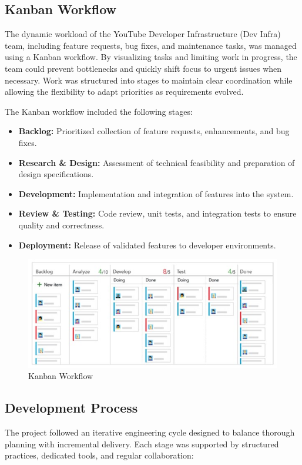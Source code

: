 \begin{spacing}{1.2}
\subsection{Kanban Workflow}
The dynamic workload of the YouTube Developer Infrastructure (Dev Infra) team, including feature requests, bug fixes, and maintenance tasks, was managed using a Kanban workflow. By visualizing tasks and limiting work in progress, the team could prevent bottlenecks and quickly shift focus to urgent issues when necessary. Work was structured into stages to maintain clear coordination while allowing the flexibility to adapt priorities as requirements evolved.  

The Kanban workflow included the following stages:

\begin{itemize}
    \item \textbf{Backlog:} Prioritized collection of feature requests, enhancements, and bug fixes.
    \item \textbf{Research \& Design:} Assessment of technical feasibility and preparation of design specifications.
    \item \textbf{Development:} Implementation and integration of features into the system.
    \item \textbf{Review \& Testing:} Code review, unit tests, and integration tests to ensure quality and correctness.
    \item \textbf{Deployment:} Release of validated features to developer environments.
\end{itemize}

\begin{figure}[H]
    \centering
    \includegraphics[scale=0.9]{Images/kanban_workflow.jpg}
    \caption{Kanban Workflow}
    \label{fig:kanban_workflow}
\end{figure}


\subsection{Development Process}
The project followed an iterative engineering cycle designed to balance thorough planning with incremental delivery. Each stage was supported by structured practices, dedicated tools, and regular collaboration:


\end{spacing}
